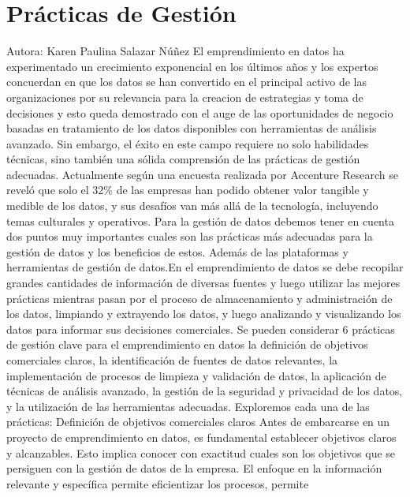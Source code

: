 \documentclass[
  letterpaper,
  DIV=11,
  numbers=noendperiod]{scrreprt}
\begin{document}

\hypertarget{pruxe1cticas-de-gestiuxf3n}{%
\chapter{Prácticas de Gestión}\label{pruxe1cticas-de-gestiuxf3n}}

Autora: Karen Paulina Salazar Núñez El emprendimiento en datos ha
experimentado un crecimiento exponencial en los últimos años y los
expertos concuerdan en que los datos se han convertido en el principal
activo de las organizaciones por su relevancia para la creacion de
estrategias y toma de decisiones y esto queda demostrado con el auge de
las oportunidades de negocio basadas en tratamiento de los datos
disponibles con herramientas de análisis avanzado. Sin embargo, el éxito
en este campo requiere no solo habilidades técnicas, sino también una
sólida comprensión de las prácticas de gestión adecuadas. Actualmente
según una encuesta realizada por Accenture Research se reveló que solo
el 32\% de las empresas han podido obtener valor tangible y medible de
los datos, y sus desafíos van más allá de la tecnología, incluyendo
temas culturales y operativos. Para la gestión de datos debemos tener en
cuenta dos puntos muy importantes cuales son las prácticas más adecuadas
para la gestión de datos y los beneficios de estos. Además de las
plataformas y herramientas de gestión de datos.En el emprendimiento de
datos se debe recopilar grandes cantidades de información de diversas
fuentes y luego utilizar las mejores prácticas mientras pasan por el
proceso de almacenamiento y administración de los datos, limpiando y
extrayendo los datos, y luego analizando y visualizando los datos para
informar sus decisiones comerciales. Se pueden considerar 6 prácticas de
gestión clave para el emprendimiento en datos la definición de objetivos
comerciales claros, la identificación de fuentes de datos relevantes, la
implementación de procesos de limpieza y validación de datos, la
aplicación de técnicas de análisis avanzado, la gestión de la seguridad
y privacidad de los datos, y la utilización de las herramientas
adecuadas. Exploremos cada una de las prácticas: Definición de objetivos
comerciales claros Antes de embarcarse en un proyecto de emprendimiento
en datos, es fundamental establecer objetivos claros y alcanzables. Esto
implica conocer con exactitud cuales son los objetivos que se persiguen
con la gestión de datos de la empresa. El enfoque en la información
relevante y específica permite eficientizar los procesos, permite
\end{document}

